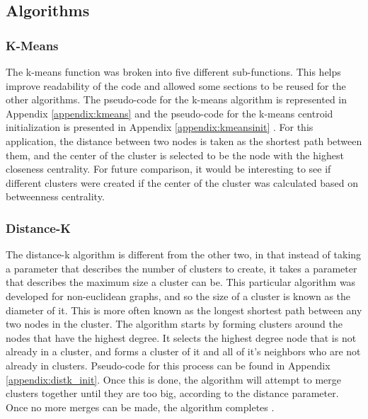\documentclass[12pt]{article}
\begin{document}
\subsection{Algorithms}

\subsubsection{K-Means}
The k-means function was broken into five different sub-functions. This helps improve readability of the code and allowed some sections to be reused for the other algorithms. The pseudo-code for the k-means algorithm is represented in Appendix \ref{appendix:kmeans} and the pseudo-code for the k-means centroid initialization is presented in Appendix \ref{appendix:kmeansinit} \cite{kmeans}. For this application, the distance between two nodes is taken as the shortest path between them, and the center of the cluster is selected to be the node with the highest closeness centrality. For future comparison, it would be interesting to see if different clusters were created if the center of the cluster was calculated based on betweenness centrality.

\subsubsection{Distance-K}
The distance-k algorithm is different from the other two, in that instead of taking a parameter that describes the number of clusters to create, it takes a parameter that describes the maximum size a cluster can be. This particular algorithm was developed for non-euclidean graphs, and so the size of a cluster is known as the diameter of it. This is more often known as the longest shortest path between any two nodes in the cluster.
\newline\newline
The algorithm starts by forming clusters around the nodes that have the highest degree. It selects the highest degree node that is not already in a cluster, and forms a cluster of it and all of it's neighbors who are not already in clusters. Pseudo-code for this process can be found in Appendix \ref{appendix:distk_init}. Once this is done, the algorithm will attempt to merge clusters together until they are too big, according to the distance parameter. Once no more merges can be made, the algorithm completes \cite{distK}.
\end{document}
